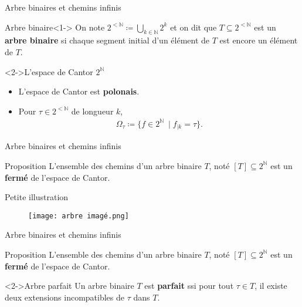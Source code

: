 \documentclass{beamer} %
\newcommand{\N}{\mathbb{N}}
\begin{document}
\begin{frame}{Arbre binaires et chemins infinis}
 
    \begin{block}{Arbre binaire}<1->
        On note $2^{<\N} \coloneqq \bigcup_{k \in \N} 2^k$ et on dit que $T \subseteq 2^{<\N}$ est un \textbf{arbre binaire} si chaque segment initial d'un élément de $T$ est encore un élément de $T$.
    \end{block}
    \begin{exampleblock}<2->{L'espace de Cantor $2^{\N}$}
        \begin{itemize}
            \item  L'espace de Cantor est \textbf{polonais}.
            \item<3->  Pour $\tau \in 2^{<\N}$ de longueur $k$, \begin{align*}
            \Omega_{\tau} \coloneqq \{f \in 2^{\N}\ \mid f_{\mid k} = \tau \}.\end{align*}
        \end{itemize}
    \end{exampleblock}
    
\end{frame}

\begin{frame}{Arbre binaires et chemins infinis}
    \begin{block}{Proposition}
        L'ensemble des chemins d'un arbre binaire $T$, noté $[T] \subseteq 2^{\N}$ est un \textbf{fermé} de l'espace de Cantor.
    \end{block}

\end{frame}
\begin{frame}{Petite illustration}
\begin{figure}
    \centering
    \texttt{[image: arbre imagé.png]}
\end{figure}
\end{frame}

\begin{frame}{Arbre binaires et chemins infinis}
    \begin{block}{Proposition}
        L'ensemble des chemins d'un arbre binaire $T$, noté $[T] \subseteq 2^{\N}$ est un \textbf{fermé} de l'espace de Cantor.
    \end{block}

    \begin{block}<2->{Arbre parfait}
        Un arbre binaire $T$ est \textbf{parfait} ssi pour tout $\tau \in T$, il existe deux extensions incompatibles de $\tau$ dans $T$.
    \end{block}
\end{frame}
\end{document}

